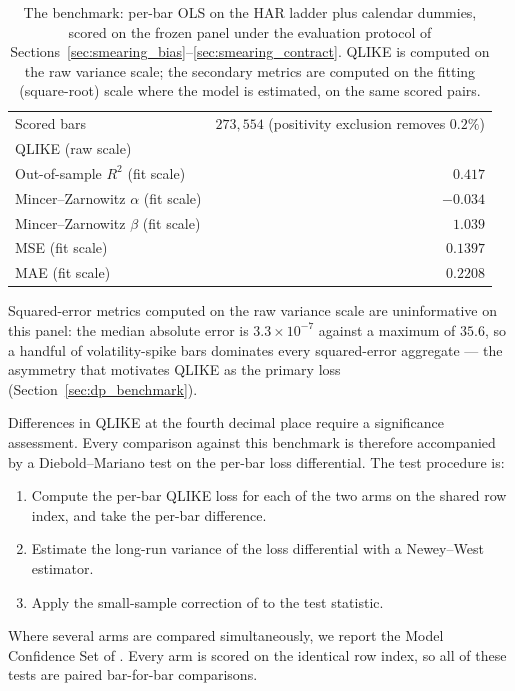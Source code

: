 \begin{table}[H]
\centering
\caption{The benchmark: per-bar OLS on the HAR ladder plus calendar
dummies, scored on the frozen panel under the evaluation protocol of
Sections~\ref{sec:smearing_bias}--\ref{sec:smearing_contract}. QLIKE is
computed on the raw variance scale; the secondary metrics are computed on
the fitting (square-root) scale where the model is estimated, on the same
scored pairs.\label{tab:benchmark}}
\begin{tabular}{@{}lr@{}}
\toprule
Scored bars & $273{,}554$ (positivity exclusion removes $0.2\%$) \\
QLIKE (raw scale) & \unifAzeroQLIKE{} \\
Out-of-sample $R^2$ (fit scale) & $0.417$ \\
Mincer--Zarnowitz $\alpha$ (fit scale) & $-0.034$ \\
Mincer--Zarnowitz $\beta$ (fit scale) & $1.039$ \\
MSE (fit scale) & $0.1397$ \\
MAE (fit scale) & $0.2208$ \\
\bottomrule
\end{tabular}
\end{table}
Squared-error metrics computed on the raw variance scale are uninformative
on this panel: the median absolute error is $3.3 \times 10^{-7}$ against a
maximum of $35.6$, so a handful of volatility-spike bars dominates every
squared-error aggregate --- the asymmetry that motivates QLIKE as the
primary loss (Section~\ref{sec:dp_benchmark}).

Differences in QLIKE at the fourth decimal place require a significance
assessment. Every comparison against this benchmark is therefore
accompanied by a Diebold--Mariano test \citep{DieboldMariano1995} on the
per-bar loss differential. The test procedure is:
\begin{enumerate}
    \item Compute the per-bar QLIKE loss for each of the two arms on the
      shared row index, and take the per-bar difference.
    \item Estimate the long-run variance of the loss differential with a
      Newey--West estimator.
    \item Apply the small-sample correction of
      \citet{HarveyLeybourneNewbold1997} to the test statistic.
\end{enumerate}
Where several arms are compared simultaneously, we report the Model
Confidence Set of \citet{HansenLundeNason2011}. Every arm is scored on the
identical row index, so all of these tests are paired bar-for-bar
comparisons.

